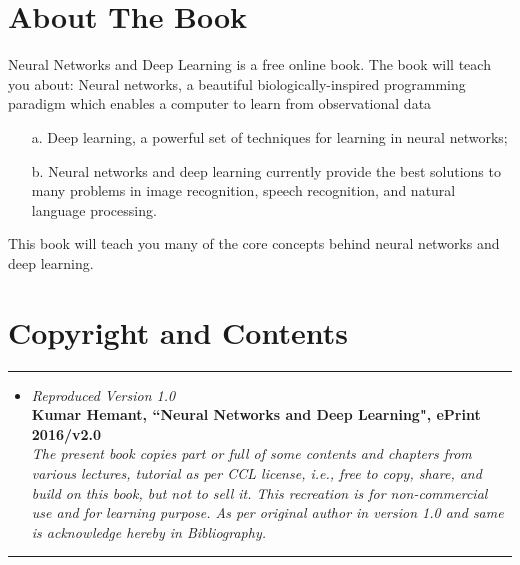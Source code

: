 \documentclass[a4paper,12pt]{report}%
\begin{document}
\newpage
{\color{gray}
\section*{\Large About The Book}
Neural Networks and Deep Learning is a free online book. The book will teach you about:
Neural networks, a beautiful biologically-inspired programming paradigm which enables a computer to learn from observational data
\begin{itemize}
\item[a.] Deep learning, a powerful set of techniques for learning in neural networks;
\item[b.] Neural networks and deep learning currently provide the best solutions to many problems in image recognition, speech recognition, and natural language processing.
\end{itemize}
This book will teach you many of the core concepts behind neural networks and deep learning.
} %



\bigskip

\vspace{1cm}


{\color{IAF}
\section*{\Large Copyright and Contents}
\hrule
\begin{itemize}

\item {\it Reproduced Version 1.0}  \\
    {\bf Kumar Hemant, ``Neural Networks and Deep Learning", ePrint 2016/v2.0} \\
    {\it The present book copies part or full of some contents and chapters from various lectures, tutorial as per CCL license, i.e., free to copy, share, and build on this book, but not to sell it. This recreation is for non-commercial use and for learning purpose. As per original author in version 1.0 and same is acknowledge hereby in Bibliography.}

\end{itemize}
\hrule
}
\end{document}
